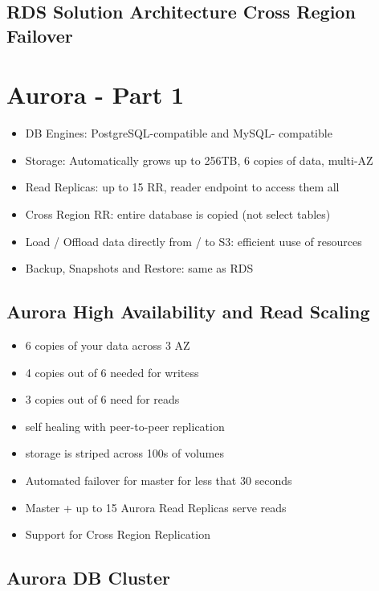 \subsection{RDS Solution Architecture Cross Region Failover}


\section{Aurora - Part 1}
\begin{itemize}
    \item DB Engines: PostgreSQL-compatible and MySQL- compatible
    \item Storage: Automatically grows up to 256TB, 6 copies of data, multi-AZ
    \item Read Replicas: up to 15 RR, reader endpoint to access them all
    \item Cross Region RR: entire database is copied (not select tables)
    \item Load / Offload data directly from / to S3: efficient uuse of resources
    \item Backup, Snapshots and Restore: same as RDS
\end{itemize}

\subsection{Aurora High Availability and Read Scaling}
\begin{itemize}
    \item 6 copies of your data across 3 AZ
    \item 4 copies out of 6 needed for writess
    \item 3 copies out of 6 need for reads
    \item self healing with peer-to-peer replication
    \item storage is striped across 100s of volumes
    \item Automated failover for master for less that 30 seconds
    \item Master + up to 15 Aurora Read Replicas serve reads
    \item Support for Cross Region Replication
\end{itemize}

\subsection{Aurora DB Cluster}

